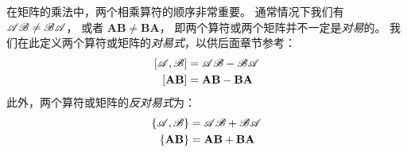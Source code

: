 在矩阵的乘法中，两个相乘算符的顺序非常重要。
通常情况下我们有 $\mathscr{A}\mathscr{B} \neq \mathscr{B}\mathscr{A}$，
或者 $\mathbf{A}\mathbf{B} \neq \mathbf{B}\mathbf{A}$，
即两个算符或两个矩阵并不一定是\emph{对易}的。
我们在此定义两个算符或矩阵的\emph{对易式}，以供后面章节参考：
\begin{subequations}
 \begin{align}
     \left[\mathscr{A}, \mathscr{B}\right] &= \mathscr{A}\mathscr{B} - \mathscr{B}\mathscr{A} \\
     \left[{\mathbf A}{\mathbf B}\right] &= {\mathbf A}{\mathbf B} - {\mathbf B}{\mathbf A}
 \end{align}
 \label{eq:1.18}
\end{subequations}
此外，两个算符或矩阵的\emph{反对易式}为：
\begin{subequations}
 \begin{align}
     \left\{\mathscr{A},\mathscr{B}\right\} &= \mathscr{A}\mathscr{B} + \mathscr{B}\mathscr{A}\label{eq:1.19a} \\
     \left\{{\mathbf A}{\mathbf B}\right\} &= {\mathbf A}{\mathbf B} + {\mathbf B}{\mathbf A}\label{eq:1.19b}
 \end{align}\label{eq:1.19}
\end{subequations}



